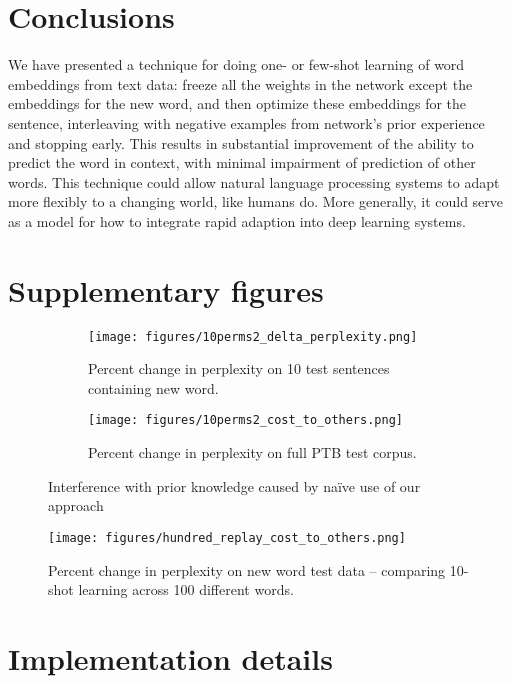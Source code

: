 \documentclass{article}
\begin{document}
\section{Conclusions}
We have presented a technique for doing one- or few-shot learning of word embeddings from text data: freeze all the weights in the network except the embeddings for the new word, and then optimize these embeddings for the sentence, interleaving with negative examples from network's prior experience and stopping early. This results in substantial improvement of the ability to predict the word in context, with minimal impairment of prediction of other words. This technique could allow natural language processing systems to adapt more flexibly to a changing world, like humans do. More generally, it could serve as a model for how to integrate rapid adaption into deep learning systems. \par 


\newpage
\appendix
\section{Supplementary figures} \label{supp_fig_appdx}

\begin{figure}[H]
\centering
\begin{subfigure}[b]{\textwidth}
\texttt{[image: figures/10perms2\_delta\_perplexity.png]}
\caption{Percent change in perplexity on 10 test sentences containing new word.}
\end{subfigure}
\begin{subfigure}[b]{\textwidth}
\texttt{[image: figures/10perms2\_cost\_to\_others.png]}
\caption{Percent change in perplexity on full PTB test corpus.}
\end{subfigure}
\caption{Interference with prior knowledge caused by na\"{i}ve use of our approach}
\label{interference_fig}
\end{figure}

\begin{figure}
\texttt{[image: figures/hundred\_replay\_cost\_to\_others.png]}
\caption{Percent change in perplexity on new word test data -- comparing 10-shot learning across 100 different words.}
\label{hundred_word_cost_figure}
\end{figure}

\section{Implementation details} \label{methods_appdx}
\end{document}
